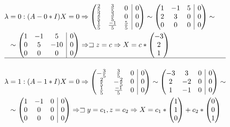 \documentclass[12pt, a4paper]{article}
\begin{document}
\begin{equation*}
\begin{aligned}
\lambda & =0: (A-0*I)X=0 \Rightarrow 
\left(
\begin{array}{@{}ccc|c@{}}
\frac{2}{5} & \frac{3}{5} & 0 & 0\\
\frac{2}{5}  & \frac{3}{5} & 0 & 0\\
\frac{1}{5}  & \frac{-1}{5} & \frac{5}{5}  & 0\\
\end{array}
\right) \sim \left(
\begin{array}{@{}ccc|c@{}}
1  & -1 & 5 & 0\\
2 & 3 & 0 & 0\\
0  & 0 & 0  & 0\\
\end{array}
\right) \sim \\
&\sim \left(
\begin{array}{@{}ccc|c@{}}
1  & -1 & 5 & 0\\
0 & 5 & -10 & 0\\
0  & 0 & 0  & 0\\
\end{array}
\right) \Rightarrow \sqsupset z=c \Rightarrow X = c * \begin{pmatrix}
-3\\
2\\
1
\end{pmatrix}\\
\hline\\
\lambda & = 1: (A-1*I)X=0 \Rightarrow 
\left(
\begin{array}{@{}ccc|c@{}}
-\frac{3}{5} & \frac{3}{5} & 0 & 0\\
\frac{2}{5}  & -\frac{2}{5} & 0 & 0\\
\frac{1}{5}  & \frac{-1}{5} & 0  & 0\\
\end{array}
\right) \sim \left(
\begin{array}{@{}ccc|c@{}}
-3  & 3 & 0 & 0\\
2 & -2 & 0 & 0\\
1  & -1 & 0  & 0\\
\end{array}
\right) \sim \\
&\sim \left(
\begin{array}{@{}ccc|c@{}}
1  & -1 & 0  & 0\\
0 & 0 & 0 & 0\\
0  & 0 & 0  & 0\\
\end{array}
\right) \Rightarrow \sqsupset y=c_1, z=c_2  \Rightarrow X = c_1 * \begin{pmatrix}
1\\
1\\
0
\end{pmatrix} + c_2 * \begin{pmatrix}
0\\
0\\
1
\end{pmatrix}
\end{aligned}
\end{equation*}
\end{document}
